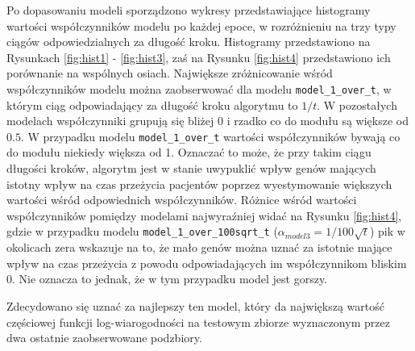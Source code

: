 Po dopasowaniu modeli sporządzono wykresy przedstawiające histogramy wartości współczynników modelu po każdej epoce, w rozróżnieniu na trzy typy ciągów odpowiedzialnych za długość kroku. Histogramy przedstawiono na Rysunkach \ref{fig:hist1} - \ref{fig:hist3}, zaś na Rysunku \ref{fig:hist4} przedstawiono ich porównanie na wspólnych osiach. Największe zróżnicowanie wśród współczynników modelu można zaobserwować dla modelu \texttt{model\_1\_over\_t}, w którym ciąg odpowiadający za długość kroku algorytmu to $1/t$. W pozostałych modelach współczynniki grupują się bliżej $0$ i rzadko co do modułu są większe od $0.5$. W przypadku modelu \texttt{model\_1\_over\_t} wartości współczynników bywają co do modułu niekiedy większa od 1. Oznaczać to może, że przy takim ciągu długości kroków, algorytm jest w stanie uwypuklić wpływ genów mających istotny wpływ na czas przeżycia pacjentów poprzez wyestymowanie większych wartości wśród odpowiednich współczynników. Różnice wśród wartości współczynników pomiędzy modelami najwyraźniej widać na Rysunku \ref{fig:hist4}, gdzie w przypadku modelu \texttt{model\_1\_over\_100sqrt\_t} ($\alpha_{model3} = 1/100\sqrt{t}$) pik w okolicach zera wskazuje na to, że mało genów można uznać za istotnie mające wpływ na czas przeżycia z powodu odpowiadających im współczynnikom bliskim $0$. Nie oznacza to jednak, że w tym przypadku model jest gorszy.

Zdecydowano się uznać za najlepszy ten model, który da największą wartość częściowej funkcji log-wiarogodności na testowym zbiorze wyznaczonym przez dwa ostatnie zaobserwowane podzbiory.  

